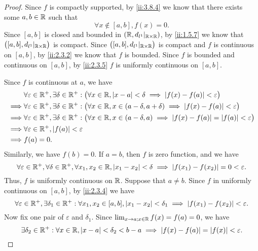 \begin{proof}
  Since \(f\) is compactly supported, by \cref{ii:3.8.4} we know that there exists some \(a, b \in \mathbb{R}\) such that
  \[
    \forall x \notin [a, b], f(x) = 0.
  \]
  Since \([a, b]\) is closed and bounded in \((\mathbb{R}, d_{l^1}|_{\mathbb{R} \times \mathbb{R}})\), by \cref{ii:1.5.7} we know that \(\big([a, b], d_{l^1}|_{\mathbb{R} \times \mathbb{R}}\big)\) is compact.
  Since \(\big([a, b], d_{l^1}|_{\mathbb{R} \times \mathbb{R}}\big)\) is compact and \(f\) is continuous on \([a, b]\), by \cref{ii:2.3.2} we know that \(f\) is bounded.
  Since \(f\) is bounded and continuous on \([a, b]\), by \cref{ii:2.3.5} \(f\) is uniformly continuous on \([a, b]\).

  Since \(f\) is continuous at \(a\), we have
  \begin{align*}
             & \forall \varepsilon \in \mathbb{R}^+, \exists \delta \in \mathbb{R}^+ : \big(\forall x \in \mathbb{R}, \left\lvert x - a\right\rvert < \delta \implies \left\lvert f(x) - f(a)\right\rvert < \varepsilon\big)               \\
    \implies & \forall \varepsilon \in \mathbb{R}^+, \exists \delta \in \mathbb{R}^+ : \big(\forall x \in \mathbb{R}, x \in (a - \delta, a + \delta) \implies \left\lvert f(x) - f(a)\right\rvert < \varepsilon\big)     \\
    \implies & \forall \varepsilon \in \mathbb{R}^+, \exists \delta \in \mathbb{R}^+ : \big(\forall x \in \mathbb{R}, x \in (a - \delta, a) \implies \left\lvert f(x) - f(a)\right\rvert = \left\lvert f(a)\right\rvert < \varepsilon\big) \\
    \implies & \forall \varepsilon \in \mathbb{R}^+, \left\lvert f(a)\right\rvert < \varepsilon                                                                                                          \\
    \implies & f(a) = 0.
  \end{align*}
  Similarly, we have \(f(b) = 0\).
  If \(a = b\), then \(f\) is zero function, and we have
  \[
    \forall \varepsilon \in \mathbb{R}^+, \forall \delta \in \mathbb{R}^+, \forall x_1, x_2 \in \mathbb{R}, \left\lvert x_1 - x_2\right\rvert < \delta \implies \left\lvert f(x_1) - f(x_2)\right\rvert = 0 < \varepsilon.
  \]
  Thus, \(f\) is uniformly continuous on \(\mathbb{R}\).
  Suppose that \(a \neq b\).
  Since \(f\) in uniformly continuous on \([a, b]\), by \cref{ii:2.3.4} we have
  \[
    \forall \varepsilon \in \mathbb{R}^+, \exists \delta_1 \in \mathbb{R}^+ : \forall x_1, x_2 \in [a, b], \left\lvert x_1 - x_2\right\rvert < \delta_1 \implies \left\lvert f(x_1) - f(x_2)\right\rvert < \varepsilon.
  \]
  Now fix one pair of \(\varepsilon\) and \(\delta_1\).
  Since \(\lim_{x \to a ; x \in \mathbb{R}} f(x) = f(a) = 0\), we have
  \[
    \exists \delta_2 \in \mathbb{R}^+ : \forall x \in \mathbb{R}, \left\lvert x - a\right\rvert < \delta_2 < b - a \implies \left\lvert f(x) - f(a)\right\rvert = \left\lvert f(x)\right\rvert < \varepsilon.
\]
\end{proof}
